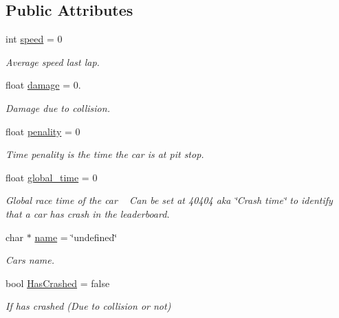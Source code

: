 \subsection*{Public Attributes}
\begin{DoxyCompactItemize}
\item 
int \hyperlink{class_cars__bot_aa1c5f72aa6b013435bab77408fd56388}{speed} = 0
\begin{DoxyCompactList}\small\item\em Average speed last lap. \end{DoxyCompactList}\item 
float \hyperlink{class_cars__bot_a358a371bdfed0782a07a958b7868b0e2}{damage} = 0.
\begin{DoxyCompactList}\small\item\em Damage due to collision. \end{DoxyCompactList}\item 
float \hyperlink{class_cars__bot_a61c7db007ee9ea521ba5369ab7d76e1e}{penality} = 0
\begin{DoxyCompactList}\small\item\em Time penality is the time the car is at pit stop. \end{DoxyCompactList}\item 
float \hyperlink{class_cars__bot_ad58234570f5051e4a607da5351cf1b78}{global\+\_\+time} = 0
\begin{DoxyCompactList}\small\item\em Global race time of the car ~\newline
 Can be set at 40404 aka \char`\"{}\+Crash time\char`\"{} to identify that a car has crash in the leaderboard. \end{DoxyCompactList}\item 
char $\ast$ \hyperlink{class_cars__bot_af68fbb76d9a894060bc33b9837d50796}{name} = \char`\"{}undefined\char`\"{}
\begin{DoxyCompactList}\small\item\em Car\textquotesingle{}s name. \end{DoxyCompactList}\item 
bool \hyperlink{class_cars__bot_a727a25c57ca410c714bf66edf809b469}{Has\+Crashed} = false
\begin{DoxyCompactList}\small\item\em If has crashed (Due to collision or not) \end{DoxyCompactList}\end{DoxyCompactItemize}


